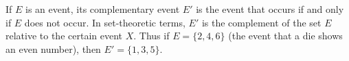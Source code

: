 If $E$ is an event, its complementary event $E'$ is the event that occurs if and only if $E$ does not occur. In set-theoretic terms, $E'$ is the complement of the set $E$ relative to the certain event $X$. Thus if $E = \{2,4,6\}$ (the event that a die shows an even number), then $E' = \{1,3,5\}$.
